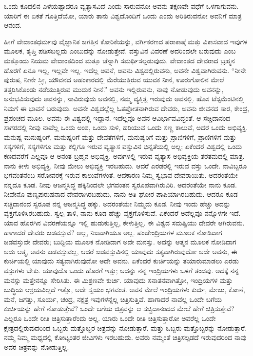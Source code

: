 ಒಂದು ಕೂದಲಿನ ಎಳೆಯಷ್ಟಾದರೂ ವ್ಯತ್ಯಾಸವಿದೆ ಎಂದು ಸಾರುವನೋ ಅವನು ತಕ್ಷಣವೇ ವಧೆಗೆ ಒಳಗಾಗುವನು. ಯಾರಿಗೆ ಈ ಏಕತೆ ಗೊತ್ತಿದೆಯೋ, ಯಾರು ತಾನು ವಿಶ್ವದೊಂದಿಗೆ ಒಂದು ಎಂದು ಅರಿತಿರುವನೋ ಅವನಿಗೆ ಮಾತ್ರ ಆನಂದ.

ಹೀಗೆ ವೇದಾಂತಧರ್ಮವು ವೈಜ್ಞಾನಿಕ ಜಗತ್ತಿನ ಕೋರಿಕೆಯನ್ನು, ವರ್ಗಿಕರಣದ ಪರಾಕಾಷ್ಠೆ ಮತ್ತು ವಿಕಾಸವಾದ ಇವುಗಳ ಮೂಲಕ, ತೃಪ್ತಿ ಪಡಿಸಬಲ್ಲದು ಎಂಬುದನ್ನು ನೋಡುತ್ತೇವೆ. ವಸ್ತುವಿನ ವಿವರಣೆ ಅದರಿಂದಲೇ ಬರುವುದು ಎಂಬ ಮತ್ತೊಂದು ನಿಯಮ ವೇದಾಂತದಿಂದ ಮತ್ತೂ ಚೆನ್ನಾಗಿ ಸಮರ್ಥಿಸಲ್ಪಡುವುದು. ವೇದಾಂತದ ದೇವರಾದ ಬ್ರಹ್ಮನ ಹೊರಗೆ ಏನೂ ಇಲ್ಲ, ಇಲ್ಲವೇ ಇಲ್ಲ. ಇದೆಲ್ಲ ಅವನೆ, ಅವನು ವಿಶ್ವದಲ್ಲಿರುವನು, ಅವನೇ ವಿಶ್ವವಾಗಿರುವನು. “ನೀನೇ ಪುರುಷ, ನೀನೇ ಸ್ತ್ರೀ, ಯೌವನದ ಅಹಂಕಾರದಲ್ಲಿ ಮೆರೆಯುತ್ತಿರುವ ಯುವಕ ನೀನೆ, ಊರುಗೋಲಿನ ಮೇಲೆ ತತ್ತರಿಸಿಕೊಂಡು ನಡೆಯುತ್ತಿರುವ ಮುದುಕ ನೀನೆ.” ಅವನು ಇಲ್ಲಿರುವನು, ನಾವು ನೋಡುವುದು ಅವನನ್ನು, ಅನುಭವಿಸುವುದು ಅವನನ್ನು, ನಾವಿರುವುದು ಅವನಲ್ಲಿ, ನಮ್ಮ ವ್ಯಕ್ತಿತ್ವ ಇರುವುದು ಅವನಲ್ಲಿ. ಹೊಸ ಟೆಸ್ಟಮೆಂಟಿನಲ್ಲಿ ನಿಮಗೆ ಈ ಭಾವನೆ ಬರುವುದು. ಅವನೇ ವಿಶ್ವದಲ್ಲೆಲ್ಲ ಓತಪ್ರೋತನಾಗಿರುವ ದೇವರು, ಅವನು ಜೀವನದ ಸಾರ, ಕೇಂದ್ರ, ಪ್ರಪಂಚದ ಮೂಲ. ಅವನು ಈ ವಿಶ್ವದಲ್ಲಿ ಇದ್ದಾನೆ. ಇದೆಲ್ಲವೂ ಅವನ ಆವಿರ್ಭಾವವಿದ್ದಂತೆ. ಆ ಸಚ್ಚಿದಾನಂದ ಸಾಗರದಲ್ಲಿ ನೀವು ನಾವೆಲ್ಲ ಒಂದು ಅಂಶ, ಒಂದು ಸುಳಿ, ಹರಿಯುವ ಒಂದು ಸಣ್ಣ ಕಾಲುವೆ, ಅದರ ಒಂದು ಅಭಿವ್ಯಕ್ತಿ. ಮನುಷ್ಯ ಮನುಷ್ಯರಿಗೆ, ಮನುಷ್ಯರಿಗೆ ಮತ್ತು ದೇವತೆಗಳಿಗೆ, ಮನುಷ್ಯರಿಗೆ ಮತ್ತು ಪ್ರಾಣಿಗಳಿಗೆ, ಪ್ರಾಣಿಗಳಿಗೆ ಮತ್ತು ಸಸ್ಯಗಳಿಗೆ, ಸಸ್ಯಗಳಿಗೂ ಮತ್ತು ಕಲ್ಲಿಗೂ ಇರುವ ವ್ಯತ್ಯಾಸ ವಸ್ತುವಿನ ಭಿನ್ನತೆಯಲ್ಲಿ ಅಲ್ಲ; ಏಕೆಂದರೆ ವಿಶ್ವದಲ್ಲಿ ಒಂದು ಕಣದವರೆಗೆ ಎಲ್ಲವೂ ಆ ಅನಂತ ಬ್ರಹ್ಮನ ಅಭಿವ್ಯಕ್ತಿ. ಅವುಗಳಲ್ಲಿ ಇರುವ ವ್ಯತ್ಯಾಸ ಅಭಿವ್ಯಕ್ತಿಯ ತರತಮದಲ್ಲಿ ಮಾತ್ರ. ನಾನು ಕೀಳು ಅಭಿವ್ಯಕ್ತಿ, ನೀವು ಮೇಲು ಅಭಿವ್ಯಕ್ತಿ ಇರಬಹುದು. ಆದರೆ ಎರಡರಲ್ಲಿ ಇರುವ ವಸ್ತು ಒಂದೇ. ನಾವಿಬ್ಬರೂ ಭಗವಂತನೆಂಬ ಸರೋವರಕ್ಕೆ ಇರುವ ಕಾಲುವೆಗಳಂತೆ. ಆದಕಾರಣ ನಿಮ್ಮ ಸ್ವಭಾವ ದೇವರಾಯಿತು. ಅದರಂತೆಯೇ ನನ್ನದೂ ಕೂಡ. ನೀವು ಆಜನ್ಮಸಿದ್ಧ ಹಕ್ಕಿನಿಂದಲೇ ಭಗವಂತನ ಸ್ವರೂಪವಾಗಿರುವಿರಿ. ಅದರಂತೆಯೇ ನಾನು ಕೂಡ. ನೀವೇನೊ ಪುಣ್ಯಪುರುಷನಾದ ದೇವರಾಗಿರಬಹುದು, ನಾನು ಅತಿ ಘೋರ ಪಾಪಿಯಾಗಿರಬಹುದು. ಆದರೂ ಕೂಡ ಸಚ್ಚಿದಾನಂದ ಸ್ವರೂಪ ನನ್ನ ಆಜನ್ಮಸಿದ್ಧ ಹಕ್ಕು. ಅದರಂತೆಯೇ ನಿಮ್ಮದು ಕೂಡ. ನೀವು ಇಂದು ಹೆಚ್ಚು ಅದನ್ನು ವ್ಯಕ್ತಗೊಳಿಸಿರಬಹುದು. ಸ್ವಲ್ಪ ತಾಳಿ, ನಾನು ಕೂಡ ಹೆಚ್ಚು ವ್ಯಕ್ತಗೊಳಿಸುವೆ. ಏಕೆಂದರೆ ಅದೆಲ್ಲವೂ ನನ್ನೊಳಗೇ ಇದೆ. ಯಾವ ಹೊರಗಿನ ವಿವರಣೆಯನ್ನೂ ಇಲ್ಲಿ ಹುಡುಕುತ್ತಿಲ್ಲ, ಕೇಳುತ್ತಿಲ್ಲ. ಈ ವಿಶ್ವದ ಸಮಷ್ಟಿಯು ದೇವರೇ ಆಗಿರುವನು. ಹಾಗಾದರೆ ದೇವರು ಜಡವಸ್ತುವೆ? ಅಲ್ಲ, ನಿಜವಾಗಿಯೂ ಅಲ್ಲ. ಪಂಚೇಂದ್ರಿಯಗಳ ಮೂಲಕ ನೋಡಿದಾಗ ಜಡವಸ್ತುವೇ ದೇವರು; ಬುದ್ದಿಯ ಮೂಲಕ ನೋಡಿದಾಗ ಅದೇ ಮನಸ್ಸು. ಅದನ್ನು ಆತ್ಮನ ಮೂಲಕ ನೋಡಿದಾಗ ಅದು ಆತ್ಮ, ಅವನು ಜಡವಸ್ತುವಲ್ಲ, ಆದರೆ ಜಡವಸ್ತುವಿನಲ್ಲಿ ಯಾವುದು ಸತ್ಯವಾಗಿರುವುದೋ ಅದೇ ಅವನು, ಈ ಕುರ್ಚಿಯಲ್ಲಿ ಯಾವುದು ಸತ್ಯವಾಗಿರುವುದೋ ಅದೇ ಅವನು. ಏಕೆಂದರೆ ಕುರ್ಚಿಯನ್ನು ತಯಾರುಮಾಡಲು ಎರಡು ವಸ್ತುಗಳು ಬೇಕು. ಯಾವುದೊ ಒಂದು ಹೊರಗೆ ಇತ್ತು; ಅದನ್ನು ನನ್ನ ಇಂದ್ರಿಯಗಳು ಒಳಗೆ ತಂದವು. ಅದಕ್ಕೆ ನನ್ನ ಮನಸ್ಸು ಮತ್ತೇನನ್ನೂ ಸೇರಿಸಿತು. ಈ ಮಿಶ್ರಣವೇ ಕುರ್ಚಿ. ಯಾವುದು ಸನಾತನವಾಗಿತ್ತೋ, ಇಂದ್ರಿಯಗಳ ಮತ್ತು ಬುದ್ಧಿಯ ಆಶ್ರಯವಿಲ್ಲದೆ ಇತ್ತೊ, ಅದೇ ಸ್ವಯಂ ಭಗವಂತ. ಅವನ ಮೇಲೆ ಇಂದ್ರಿಯಗಳು ಕುರ್ಚಿ, ಮೇಜು, ಕೋಣೆ, ಮನೆ, ಜಗತ್ತು, ಸೂರ್ಯ, ಚಂದ್ರ, ನಕ್ಷತ್ರ ಇವುಗಳನ್ನೆಲ್ಲ ಚಿತ್ರಿಸುತ್ತಿವೆ. ಹಾಗಾದರೆ ನಾವೆಲ್ಲ ಒಂದೇ ಬಗೆಯ ಕುರ್ಚಿಯನ್ನು ಹೇಗೆ ನೋಡುತ್ತೇವೆ? ಒಂದೇ ಬಗೆಯ ಚಿತ್ರವನ್ನು ಆ ಸಚ್ಚಿದಾನಂದದ ಮೇಲೆ ಹೇಗೆ ಚಿತ್ರಿಸುತ್ತೇವೆ? ಎಲ್ಲರೂ ಒಂದೇ ರೀತಿ ಚಿತ್ರಿಸುತ್ತಾರೆಂದು ಅಲ್ಲ. ಯಾರು ಒಂದೇ ರೀತಿ ಚಿತ್ರಿಸುತ್ತಾರೋ ಅವರೆಲ್ಲ ಒಂದೇ ಕ್ಷೇತ್ರದಲ್ಲಿರುವುದರಿಂದ ಒಬ್ಬರು ಮತ್ತೊಬ್ಬರ ಚಿತ್ರವನ್ನು ನೋಡುತ್ತಾರೆ. ಮತ್ತು ಒಬ್ಬರು ಮತ್ತೊಬ್ಬರನ್ನು ನೋಡುತ್ತಾರೆ. ನಮ್ಮ ನಿಮ್ಮ ಮಧ್ಯದಲ್ಲಿ ಕೋಟ್ಯಂತರ ಜೀವಿಗಳು ಇರಬಹುದು. ಅವರು ನಮ್ಮಂತೆ ಚಿತ್ರಿಸಲ್ಪಡದೆ ಇರುವುದರಿಂದ ನಾವು ಅವರ ಚಿತ್ರವನ್ನು ನೋಡುತ್ತಿಲ್ಲ.

